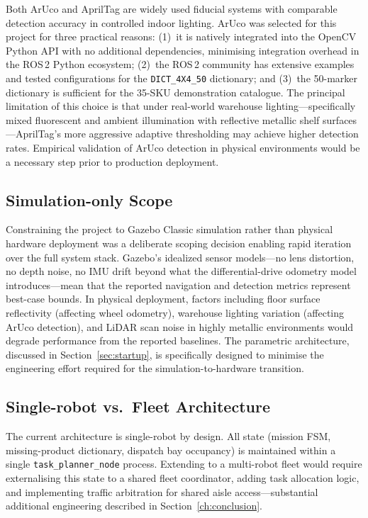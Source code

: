 \documentclass[12pt,a4paper]{report}
\begin{document}
Both ArUco \citep{garrido2014} and AprilTag \citep{olson2011} are widely used fiducial systems with comparable detection accuracy in controlled indoor lighting. ArUco was selected for this project for three practical reasons: (1)~it is natively integrated into the OpenCV Python API with no additional dependencies, minimising integration overhead in the ROS\,2 Python ecosystem; (2)~the ROS\,2 community has extensive examples and tested configurations for the \texttt{DICT\_4X4\_50} dictionary; and (3)~the 50-marker dictionary is sufficient for the 35-SKU demonstration catalogue. The principal limitation of this choice is that under real-world warehouse lighting---specifically mixed fluorescent and ambient illumination with reflective metallic shelf surfaces---AprilTag's more aggressive adaptive thresholding may achieve higher detection rates. Empirical validation of ArUco detection in physical environments would be a necessary step prior to production deployment.

\subsection{Simulation-only Scope}

Constraining the project to Gazebo Classic simulation rather than physical hardware deployment was a deliberate scoping decision enabling rapid iteration over the full system stack. Gazebo's idealized sensor models---no lens distortion, no depth noise, no IMU drift beyond what the differential-drive odometry model introduces---mean that the reported navigation and detection metrics represent best-case bounds. In physical deployment, factors including floor surface reflectivity (affecting wheel odometry), warehouse lighting variation (affecting ArUco detection), and LiDAR scan noise in highly metallic environments would degrade performance from the reported baselines. The parametric architecture, discussed in Section~\ref{sec:startup}, is specifically designed to minimise the engineering effort required for the simulation-to-hardware transition.

\subsection{Single-robot vs.\ Fleet Architecture}

The current architecture is single-robot by design. All state (mission FSM, missing-product dictionary, dispatch bay occupancy) is maintained within a single \texttt{task\_planner\_node} process. Extending to a multi-robot fleet would require externalising this state to a shared fleet coordinator, adding task allocation logic, and implementing traffic arbitration for shared aisle access---substantial additional engineering described in Section~\ref{ch:conclusion}.
\end{document}
